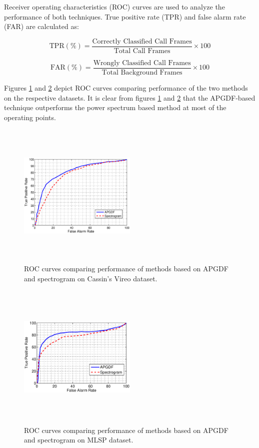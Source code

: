 \documentclass[a4paper]{article}
\begin{document}
Receiver operating characteristics (ROC) curves are used to analyze the
performance of both techniques. True positive rate (TPR) and false alarm rate
(FAR) are calculated as:

\begin{equation}
\text{TPR} (\%)=\frac{\text{Correctly Classified Call Frames}}
{\text{Total Call Frames}} \times 100 
\end{equation}

\begin{equation}
\text{FAR} (\%)=\frac{\text{Wrongly Classified Call Frames}}
{\text{Total Background Frames}} \times 100 
\end{equation}

Figures \ref{fig:ROCdata1} and  \ref{fig:ROCdata2} depict ROC curves comparing
performance of the two methods on the respective datasets. It is clear from
figures \ref{fig:ROCdata1} and  \ref{fig:ROCdata2} that the APGDF-based
technique outperforms the power spectrum based method at most of the  operating
points.

\begin{figure}[h]
\centering
\includegraphics[width=0.5\textwidth,height=7cm]{gd1.eps}
\caption{ROC  curves  comparing  performance  of  methods based on APGDF and 
spectrogram on Cassin's Vireo dataset.}
\label{fig:ROCdata1}
\end{figure}
 
\begin{figure}[!ht]
	\centering
	\includegraphics[width=0.5\textwidth,height=7cm] {gd2.eps}
	\caption{ROC curves comparing performance of methods based on APGDF and 
	spectrogram on MLSP dataset.}   
	\label{fig:ROCdata2}
\end{figure} 
\end{document}
